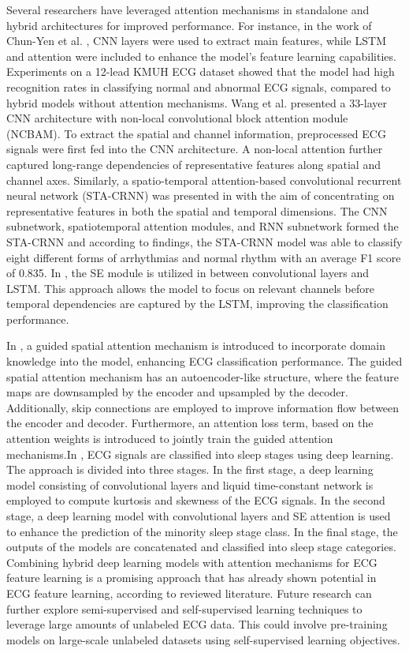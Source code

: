 \documentclass[preprint,12pt]{elsarticle}
\begin{document}
Several researchers have leveraged attention mechanisms in standalone and hybrid architectures for improved performance. For instance, in the work of Chun-Yen et al. \citep{chen_automated_2022}, CNN layers were used to extract main features, while LSTM and attention were included to enhance the model's feature learning capabilities. Experiments on a 12-lead KMUH ECG dataset showed that the model had high recognition rates in classifying normal and abnormal ECG signals, compared to hybrid models without attention mechanisms. Wang et al. \citep{wang_automated_2021} presented a 33-layer CNN architecture with non-local convolutional block attention module (NCBAM). To extract the spatial and channel information, preprocessed ECG signals were first fed into the CNN architecture. A non-local attention further captured long-range dependencies of representative features along spatial and channel axes. Similarly, a spatio-temporal attention-based convolutional recurrent neural network (STA-CRNN) was presented in \citep{zhang_ecg-based_2020} with the aim of concentrating on representative features in both the spatial and temporal dimensions. The CNN subnetwork, spatiotemporal attention modules, and RNN subnetwork formed the STA-CRNN and according to findings, the STA-CRNN model was able to classify eight different forms of arrhythmias and normal rhythm with an average F1 score of 0.835. In \citep{sun_arrhythmia_2024}, the SE module is utilized in between convolutional layers and LSTM. This approach allows the model to focus on relevant channels before temporal dependencies are captured by the LSTM, improving the classification performance.

In \citep{huang_ecg_2024}, a guided spatial attention mechanism is introduced to incorporate domain knowledge into the model, enhancing ECG classification performance. The guided spatial attention mechanism has an autoencoder-like structure, where the feature maps are downsampled by the encoder and upsampled by the decoder. Additionally, skip connections are employed to improve information flow between the encoder and decoder. Furthermore, an attention loss term, based on the attention weights is introduced to jointly train the guided attention mechanisms.In \citep{aghaomidi_ecg-sleepnet_2024}, ECG signals are classified into sleep stages using deep learning. The approach is divided into three stages. In the first stage, a deep learning model consisting of convolutional layers and liquid time-constant network \citep{hasani_liquid_2021} is employed to compute kurtosis and skewness of the ECG signals. In the second stage, a deep learning model with convolutional layers and SE attention is used to enhance the prediction of the minority sleep stage class. In the final stage, the outputs of the models are concatenated and classified into sleep stage categories. Combining hybrid deep learning models with attention mechanisms for ECG feature learning is a promising approach that has already shown potential in ECG feature learning, according to reviewed literature. Future research can further explore semi-supervised and self-supervised learning techniques to leverage large amounts of unlabeled ECG data. This could involve pre-training models on large-scale unlabeled datasets using self-supervised learning objectives. 
\end{document}
